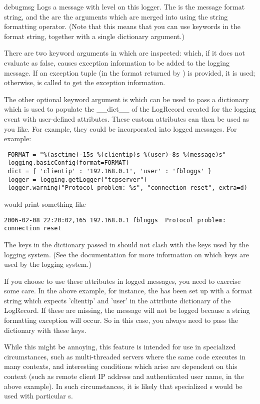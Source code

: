 \begin{methoddesc}{debug}{msg}
Logs a message with level  on this logger.
The  is the message format string, and the  are the
arguments which are merged into  using the string formatting
operator. (Note that this means that you can use keywords in the
format string, together with a single dictionary argument.)

There are two keyword arguments in  which are inspected:
 which, if it does not evaluate as false, causes exception
information to be added to the logging message. If an exception tuple (in the
format returned by ) is provided, it is used;
otherwise,  is called to get the exception
information.

The other optional keyword argument is  which can be used to pass
a dictionary which is used to populate the __dict__ of the LogRecord created
for the logging event with user-defined attributes. These custom attributes
can then be used as you like. For example, they could be incorporated into
logged messages. For example:

\begin{verbatim}
 FORMAT = "%(asctime)-15s %(clientip)s %(user)-8s %(message)s"
 logging.basicConfig(format=FORMAT)
 dict = { 'clientip' : '192.168.0.1', 'user' : 'fbloggs' }
 logger = logging.getLogger("tcpserver")
 logger.warning("Protocol problem: %s", "connection reset", extra=d)
\end{verbatim}

would print something like
\begin{verbatim}
2006-02-08 22:20:02,165 192.168.0.1 fbloggs  Protocol problem: connection reset
\end{verbatim}

The keys in the dictionary passed in  should not clash with the keys
used by the logging system. (See the  documentation for more
information on which keys are used by the logging system.)

If you choose to use these attributes in logged messages, you need to exercise
some care. In the above example, for instance, the  has been
set up with a format string which expects 'clientip' and 'user' in the
attribute dictionary of the LogRecord. If these are missing, the message will
not be logged because a string formatting exception will occur. So in this
case, you always need to pass the  dictionary with these keys.

While this might be annoying, this feature is intended for use in specialized
circumstances, such as multi-threaded servers where the same code executes
in many contexts, and interesting conditions which arise are dependent on this
context (such as remote client IP address and authenticated user name, in the
above example). In such circumstances, it is likely that specialized
s would be used with particular s.


\end{methoddesc}

